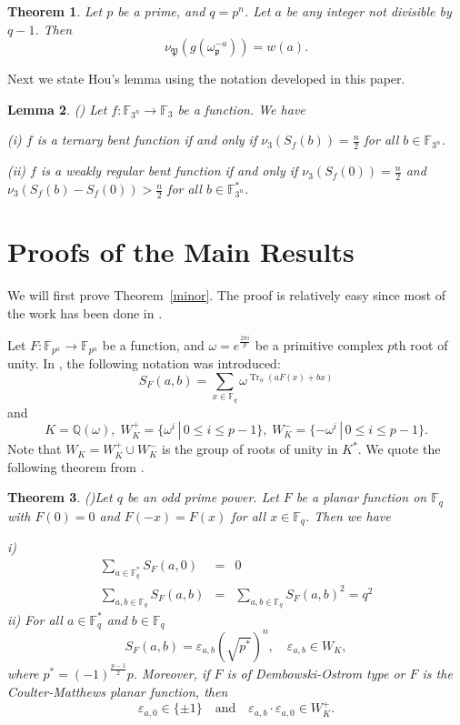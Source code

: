 \documentclass[11pt, reqno]{amsart}
\newtheorem{teor}{Theorem}[section]
\newtheorem{lem}[teor]{Lemma}
\newcommand{\Ff}{{\mathbb F}}
\def\Tr{\operatorname{Tr}}
\def\Tr{\operatorname{Tr}}
\begin{document}
 \begin{teor}\label{stick}
Let $p$ be a prime, and $q=p^n$. Let $a$ be any integer not
divisible by $q-1$. Then
$$\nu_{\mathfrak{P}}(g(\omega_{\mathfrak p}^{-a}))=w(a).$$
\end{teor}

Next we state Hou's lemma using the notation developed in this
paper.

\begin{lem} {\rm (\cite{hou})} \label{hou1}
Let $f: \Ff_{3^n}\rightarrow \Ff_3$ be a function. We have\

{\rm (i)} $f$ is a ternary bent function if and only if
$\nu_3(S_f(b))=\frac{n}{2}$ for all $b\in\Ff_{3^n}$.\

{\rm (ii)} $f$ is a weakly regular bent function if and only if
$\nu_3(S_f(0))=\frac{n}{2}$ and $\nu_3(S_f(b)-S_f(0))>\frac{n}{2}$
for all $b\in \Ff_{3^n}^*$.
\end{lem}


\section{Proofs of the Main Results}\label{proof}

We will first prove Theorem~\ref{minor}. The proof is relatively
easy since most of the work has been done in \cite{fl}.

Let $F:\Ff_{p^n}\rightarrow\Ff_{p^n}$ be a function, and
$\omega=e^{\frac{2\pi i}{p}}$ be a primitive complex $p$th root of
unity. In \cite{fl}, the following notation was introduced:
$$S_F(a,b)=\sum_{x \in \Ff_q} \omega^{\Tr_n(aF(x)+bx)}$$
and $$K=\mathbb{Q}(\omega),\; W_K^{+}=\{\omega^i\,|\,0 \le i \le
p-1\}, \; W_K^{-}=\{-\omega^i\,|\,0 \le i \le p-1\}.$$ Note that
$W_K=W_K^{+}\cup W_K^-$ is the group of roots of unity in $K^*$. We
quote the following theorem from \cite{fl}.

\begin{teor}{\em(\cite{fl})}\label{cm}
Let $q$ be an odd prime power. Let $F$ be a planar function on
$\Ff_q$ with $F(0)=0$ and $F(-x)=F(x)$ for all $x\in \Ff_q$. Then we
have

i) \begin{eqnarray*}
   \sum_{a \in \Ff_q^*}S_F(a, 0)&=&0\\
   \sum_{a, b \in \Ff_q}S_F(a,b)&=&\sum_{a, b\in \Ff_q}S_F(a, b)^2=q^2
\end{eqnarray*}
ii) For all $a \in \Ff_q^*$ and $b \in \Ff_q$
$$S_F(a, b)=\varepsilon_{a, b}(\sqrt{p^*})^n,\quad \varepsilon_{a, b}\in W_K,$$
where $p^*=(-1)^{\frac{p-1}{2}}p$. Moreover, if $F$ is of
Dembowski-Ostrom type or $F$ is the Coulter-Matthews planar
function, then
$$\varepsilon_{a, 0}\in \{\pm 1\}\quad\mbox{and}\quad \varepsilon_{a, b}\cdot\varepsilon_{a, 0}\in W_K^+.$$
\end{teor}
\end{document}
